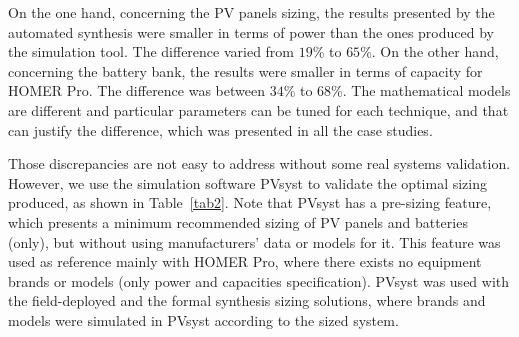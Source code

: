 \documentclass[runningheads]{llncs}
\begin{document}
On the one hand, concerning the PV panels sizing, the results presented by the automated synthesis were smaller in terms of power than the ones produced by the simulation tool. The difference varied from $19$\% to $65$\%. On the other hand, concerning the battery bank, the results were smaller in terms of capacity for HOMER Pro. The difference was between $34$\% to $68$\%. The mathematical models are different and particular parameters can be tuned for each technique, and that can justify the difference, which was presented in all the case studies.

Those discrepancies are not easy to address without some real systems validation. However, we use the simulation software PVsyst to validate the optimal sizing produced, as shown in Table~\ref{tab2}. Note that PVsyst has a pre-sizing feature, which presents a minimum recommended sizing of PV panels and batteries (only), but without using manufacturers' data or models for it. This feature was used as reference mainly with HOMER Pro, where there exists no equipment brands or models (only power and capacities specification). PVsyst was used with the field-deployed and the formal synthesis sizing solutions, where brands and models were simulated in PVsyst according to the sized system.
\end{document}
